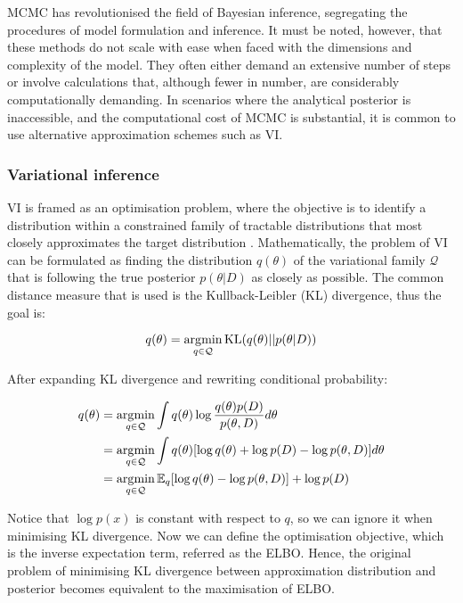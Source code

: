 \ac{MCMC} has revolutionised the field of Bayesian inference, segregating the procedures of model formulation and inference. It must be noted, however, that these methods do not scale with ease when faced with the dimensions and complexity of the model. They often either demand an extensive number of steps or involve calculations that, although fewer in number, are considerably computationally demanding. In scenarios where the analytical posterior is inaccessible, and the computational cost of \ac{MCMC} is substantial, it is common to use alternative approximation schemes such as \ac{VI}.

\subsubsection*{Variational inference}
\Acl{VI} is framed as an optimisation problem, where the objective is to identify a distribution within a constrained family of tractable distributions that most closely approximates the target distribution \parencite{Blei2017-dm}. Mathematically, the problem of \acl{VI} can be formulated as finding the distribution $q(\theta)$ of the variational family $\mathcal{Q}$ that is following the true posterior $p(\theta | D)$ as closely as possible. The common distance measure that is used is the Kullback-Leibler (KL) divergence, thus the goal is:

\begin{equation}
q(\theta) = \operatorname*{\arg\!\min}_{q \in \mathcal{Q}} \text{KL}(q(\theta) || p(\theta | D))  
\end{equation}

After expanding KL divergence and rewriting conditional probability:

\begin{align}
q(\theta) &= \operatorname*{\arg\!\min}_{q \in \mathcal{Q}} \int q(\theta) \log \frac{q(\theta) p(D)}{p(\theta, D)} d\theta \\
&= \operatorname*{\arg\!\min}_{q \in \mathcal{Q}} \int q(\theta) [\log q(\theta) + \log p(D) - \log p(\theta, D)] d\theta \\
&= \operatorname*{\arg\!\min}_{q \in \mathcal{Q}} \mathbb{E}_q [\log q(\theta) -  \log p(\theta, D)] + \log p(D)
\end{align}


Notice that $\log p(x)$ is constant with respect to $q$, so we can ignore it when minimising KL divergence. Now we can define the optimisation objective, which is the inverse expectation term, referred as the \ac{ELBO}. Hence, the original problem of minimising KL divergence between approximation distribution and posterior becomes equivalent to the maximisation of \ac{ELBO}. 

